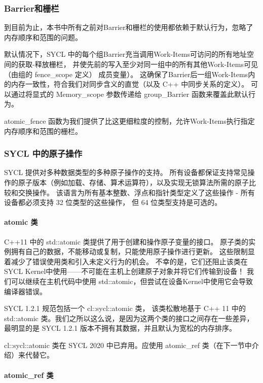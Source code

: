 \subsubsection{Barrier和栅栏}
到目前为止，本书中所有之前对Barrier和栅栏的使用都依赖于默认行为，忽略了内存顺序和范围的问题。

默认情况下，SYCL 中的每个组Barrier充当调用Work-Items可访问的所有地址空间的获取-释放栅栏，
并使先前的写入至少对同一组中的所有其他Work-Items可见（由组的 fence\_scope 定义） 成员变量）。 
这确保了Barrier后一组Work-Items内的内存一致性，符合我们对同步含义的直觉（以及 C++ 中同步关系的定义）。 
可以通过将显式的 Memory\_scope 参数传递给 group\_Barrier 函数来覆盖此默认行为。

atomic\_fence 函数为我们提供了比这更细粒度的控制，允许Work-Items执行指定内存顺序和范围的栅栏。

\subsubsection{SYCL 中的原子操作}
SYCL 提供对多种数据类型的多种原子操作的支持。 
所有设备都保证支持常见操作的原子版本（例如加载、存储、算术运算符），以及实现无锁算法所需的原子比较和交换操作。 
该语言为所有基本整数、浮点和指针类型定义了这些操作 - 所有设备都必须支持 32 位类型的这些操作，
但 64 位类型支持是可选的。

\paragraph{atomic 类}

C++11 中的 std::atomic 类提供了用于创建和操作原子变量的接口。 
原子类的实例拥有自己的数据，不能移动或复制，只能使用原子操作进行更新。 
这些限制显着减少了错误使用类和引入未定义行为的机会。 
不幸的是，它们还阻止该类在 SYCL Kernel中使用——不可能在主机上创建原子对象并将它们传输到设备！ 
我们可以继续在主机代码中使用 std::atomic，但尝试在设备Kernel中使用它会导致编译器错误。

\begin{remark}
SYCL 1.2.1 规范包括一个 cl::sycl::atomic 类，
该类松散地基于 C++ 11 中的 std::atomic 类。我们之所以这么说，是因为这两个类的接口之间存在一些差异，
最明显的是 SYCL 1.2.1 版本不拥有其数据，并且默认为宽松的内存排序。
\end{remark}

cl::sycl::atomic 类在 SYCL 2020 中已弃用。应使用 atomic\_ref 类（在下一节中介绍）来代替它。

\paragraph{atomic\_ref 类}


